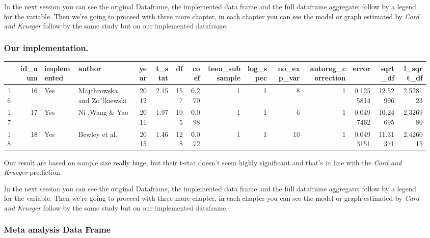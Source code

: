 \documentclass[
]{article}
\begin{document}
In the next session you can see the original Dataframe, the implemented
data frame and the full dataframe aggregate; follow by a legend for the
variable. Then we're going to proceed with three more chapter, in each
chapter you can see the model or graph estimated by \emph{Card and
Krueger} follow by the same study but on our implemented dataframe.

\hypertarget{our-implementation.}{%
\subsubsection{Our implementation.}\label{our-implementation.}}

\begin{table}
\centering\begingroup\fontsize{11}{13}\selectfont

\begin{tabular}{lrllrrrrrrrrrrr}
\toprule
  & id\_num & implemented & author & year & t\_stat & df & coef & teen\_subsample & log\_spec & no\_exp\_var & autoreg\_correction & error & sqrt\_df & l\_sqrt\_df\\
\midrule
16 & 16 & Yes & Majchrowska and Zo´lkiewski & 2012 & 2.15 & 157 & 0.270 & 1 & 1 & 8 & 1 & 0.1255814 & 12.52996 & 2.528123\\
17 & 17 & Yes & Ni ,Wang \& Yao & 2011 & 1.97 & 105 & 0.098 & 1 & 1 & 6 & 1 & 0.0497462 & 10.24695 & 2.326980\\
18 & 18 & Yes & Bewley et al. & 2015 & 1.46 & 128 & 0.072 & 1 & 1 & 10 & 1 & 0.0493151 & 11.31371 & 2.426015\\
\bottomrule
\end{tabular}
\endgroup{}
\end{table}

Our result are based on sample size really huge, but their t-stat
doesn't seem highly significant and that's in line with the \emph{Card
and Krueger} prediction.

In the next session you can see the original Dataframe, the implemented
data frame and the full dataframe aggregate; follow by a legend for the
variable. Then we're going to proceed with three more chapter, in each
chapter you can see the model or graph estimated by \emph{Card and
Krueger} follow by the same study but on our implemented dataframe.

\hypertarget{meta-analysis-data-frame}{%
\subsubsection{Meta analysis Data
Frame}\label{meta-analysis-data-frame}}
\end{document}
